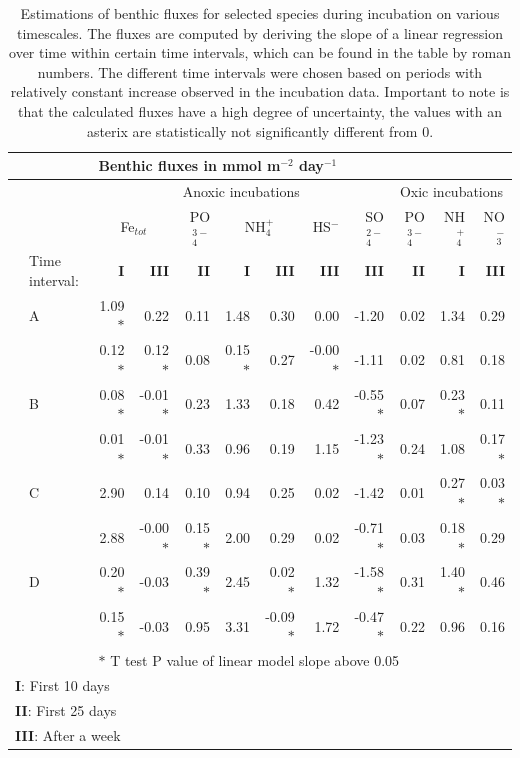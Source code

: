 \documentclass[a4paper,11pt]{article}
\begin{document}
\begin{table}[ht]
\centering
\begin{tabular}{rl|rrrrrrr||rrr|}
  \toprule
  & &\multicolumn{10}{l}{\textbf{Benthic fluxes in mmol m$^{-2}$ day$^{-1}$}} \\
  \hline
  & & \multicolumn{7}{c}{Anoxic incubations} & \multicolumn{3}{c}{Oxic incubations} \\
 &  &  \multicolumn{2}{c}{Fe$_{tot}$} & PO$_4^{3-}$ & \multicolumn{2}{c}{NH$_{4}^+$} & HS$^-$ & SO$_4^{2-}$ & 
 PO$_4^{3-}$ & NH$_{4}^+$ &  NO$_3^-$ \\ 
 & \footnotesize{Time interval:} & \textbf{I} & \textbf{III} & \textbf{II} & \textbf{I} & \textbf{III} & \textbf{III} & \textbf{III} & \textbf{II} & \textbf{I} &  \textbf{III} \\
  \hline
& A & 1.09$\ast$ & 0.22 & 0.11 & 1.48 & 0.30 & 0.00 & -1.20 & 0.02 & 1.34 &  0.29 \\ 
&  & 0.12$\ast$  & 0.12$\ast$ & 0.08 & 0.15$\ast$ & 0.27 & -0.00$\ast$ & -1.11 & 0.02 & 0.81 &  0.18 \\ \hline
& B & 0.08$\ast$ & -0.01$\ast$ & 0.23 & 1.33 & 0.18 & 0.42 & -0.55$\ast$ & 0.07 & 0.23$\ast$ &  0.11 \\ 
&  & 0.01$\ast$ & -0.01$\ast$ & 0.33 & 0.96 & 0.19 & 1.15 & -1.23$\ast$ & 0.24 & 1.08 & 0.17$\ast$ \\ \hline
& C & 2.90 & 0.14 & 0.10 & 0.94 & 0.25 & 0.02 & -1.42 & 0.01 & 0.27$\ast$ &  0.03$\ast$ \\ 
&  & 2.88 & -0.00$\ast$ & 0.15$\ast$ & 2.00 & 0.29 & 0.02 & -0.71$\ast$ & 0.03 & 0.18$\ast$ &  0.29 \\ \hline
& D & 0.20$\ast$ & -0.03 & 0.39$\ast$ & 2.45 & 0.02$\ast$ & 1.32 & -1.58$\ast$ & 0.31 & 1.40$\ast$  & 0.46 \\ 
&  & 0.15$\ast$ & -0.03 & 0.95 & 3.31 & -0.09$\ast$ & 1.72 & -0.47$\ast$ & 0.22 & 0.96  & 0.16 \\ 
   \hline
   & & \multicolumn{10}{l}{\scriptsize{$\ast$ T test P value of linear model slope above 0.05}} \\
   \multicolumn{12}{l}{\footnotesize{\textbf{I}: First 10 days}} \\
   \multicolumn{12}{l}{\footnotesize{\textbf{II}: First 25 days}} \\
   \multicolumn{12}{l}{\footnotesize{\textbf{III}: After a week}} \\
   \bottomrule
\end{tabular}
\caption{Estimations of benthic fluxes for selected species during incubation on various timescales. The fluxes are computed by deriving the slope of a linear regression over time within certain time intervals, which can be found in the table by roman numbers. The different time intervals were chosen based on periods with relatively constant increase observed in the incubation data. Important to note is that the calculated fluxes have a high degree of uncertainty, the values with an asterix are statistically not significantly different from 0.}
    \label{tab:flux}
\end{table}
\end{document}
